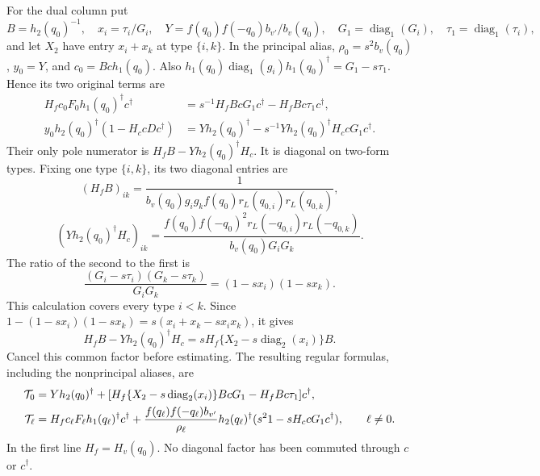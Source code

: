\documentclass[11pt,reqno]{amsart}
\numberwithin{equation}{section}
\theoremstyle{definition}
\theoremstyle{remark}
\begin{document}
For the dual column put
\[
 B=h_2(q_0)^{-1},\quad x_i=\tau_i/G_i,\quad
 Y=f(q_0)f(-q_0)b_{v'}/b_v(q_0),\quad
 G_1=\operatorname{diag}_1(G_i),\quad\tau_1=\operatorname{diag}_1(\tau_i),
\]
and let \(X_2\) have entry \(x_i+x_k\) at type \(\{i,k\}\).
In the principal alias,
\(\rho_0=s^2b_v(q_0)\), \(y_0=Y\), and
\(c_0=Bch_1(q_0)\). Also
\(h_1(q_0)\operatorname{diag}_1(g_i)h_1(q_0)^\dagger
=G_1-s\tau_1\). Hence its two original terms are
\begin{align*}
 H_fc_0F_0h_1(q_0)^\dagger c^\dagger
      &=s^{-1}H_fBcG_1c^\dagger-H_fBc\tau_1c^\dagger,\\
 y_0h_2(q_0)^\dagger(1-H_ccDc^\dagger)
      &=Yh_2(q_0)^\dagger
                       -s^{-1}Yh_2(q_0)^\dagger H_ccG_1c^\dagger.
\end{align*}
Their only pole numerator is \(H_fB-Yh_2(q_0)^\dagger H_c\).
It is diagonal on two-form types. Fixing one type \(\{i,k\}\),
its two diagonal entries are
\[
 (H_fB)_{ik}
   =\frac1{b_v(q_0)g_ig_k f(q_0)r_L(q_{0,i})r_L(q_{0,k})},
\]
\[
 (Yh_2(q_0)^\dagger H_c)_{ik}
   =\frac{f(q_0)f(-q_0)^2r_L(-q_{0,i})r_L(-q_{0,k})}
                                                   {b_v(q_0)G_iG_k}.
\]
The ratio of the second to the first is
\[
 \frac{(G_i-s\tau_i)(G_k-s\tau_k)}{G_iG_k}
                        =(1-sx_i)(1-sx_k).
\]
This calculation covers every type \(i<k\). Since
\(1-(1-sx_i)(1-sx_k)=s(x_i+x_k-sx_ix_k)\), it gives
\[
 H_fB-Yh_2(q_0)^\dagger H_c
          =sH_f\{X_2-s\operatorname{diag}_2(x_i)\}B.
\]
Cancel this common factor before estimating. The resulting
regular formulas, including the nonprincipal aliases, are
\begin{align}
 \mathcal T_0={}&Yh_2(q_0)^\dagger+
       [H_f\{X_2-s\operatorname{diag}_2(x_i)\}BcG_1
                               -H_fBc\tau_1]c^\dagger,\notag\\
 \mathcal T_\ell={}&H_fc_\ell F_\ell h_1(q_\ell)^\dagger c^\dagger
  +\frac{f(q_\ell)f(-q_\ell)b_{v'}}{\rho_\ell}
         h_2(q_\ell)^\dagger(s^2 1-sH_ccG_1c^\dagger),
                                      \qquad\ell\ne0.
 \label{eq:calibration-filled-dual}
\end{align}
In the first line \(H_f=H_v(q_0)\). No diagonal factor has
been commuted through \(c\) or \(c^\dagger\).
\end{document}

